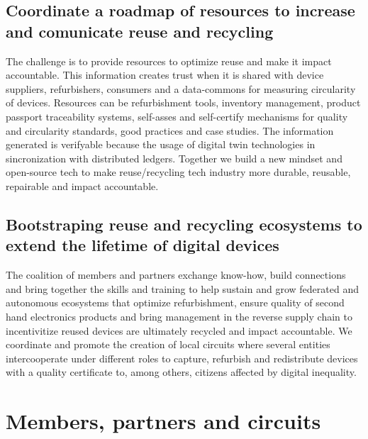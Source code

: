 \documentclass[
]{book}
\begin{document}
\hypertarget{coordinate-a-roadmap-of-resources-to-increase-and-comunicate-reuse-and-recycling}{%
\subsection{Coordinate a roadmap of resources to increase and comunicate reuse and recycling}\label{coordinate-a-roadmap-of-resources-to-increase-and-comunicate-reuse-and-recycling}}

The challenge is to provide resources to optimize reuse and make it impact accountable. This information creates trust when it is shared with device suppliers, refurbishers, consumers and a data-commons for measuring circularity of devices. Resources can be refurbishment tools, inventory management, product passport traceability systems, self-asses and self-certify mechanisms for quality and circularity standards, good practices and case studies. The information generated is verifyable because the usage of digital twin technologies in sincronization with distributed ledgers. Together we build a new mindset and open-source tech to make reuse/recycling tech industry more durable, reusable, repairable and impact accountable.

\hypertarget{bootstraping-reuse-and-recycling-ecosystems-to-extend-the-lifetime-of-digital-devices}{%
\subsection{Bootstraping reuse and recycling ecosystems to extend the lifetime of digital devices}\label{bootstraping-reuse-and-recycling-ecosystems-to-extend-the-lifetime-of-digital-devices}}

The coalition of members and partners exchange know-how, build connections and bring together the skills and training to help sustain and grow federated and autonomous ecosystems that optimize refurbishment, ensure quality of second hand electronics products and bring management in the reverse supply chain to incentivitize reused devices are ultimately recycled and impact accountable. We coordinate and promote the creation of local circuits where several entities intercooperate under different roles to capture, refurbish and redistribute devices with a quality certificate to, among others, citizens affected by digital inequality.

\hypertarget{members-partners-and-circuits}{%
\section{Members, partners and circuits}\label{members-partners-and-circuits}}
\end{document}
